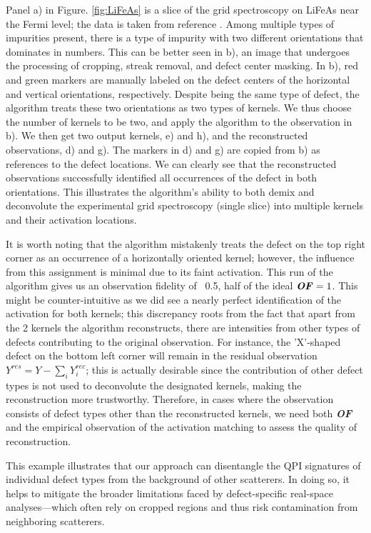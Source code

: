 Panel a) in Figure. \ref{fig:LiFeAs} is a slice of the grid spectroscopy on LiFeAs near the Fermi level; the data is taken from reference \cite{chiScanningTunnelingSpectroscopy2012}. Among multiple types of impurities present, there is a type of impurity with two different orientations that dominates in numbers. This can be better seen in b), an image that undergoes the processing of cropping, streak removal, and defect center masking. In b), red and green markers are manually labeled on the defect centers of the horizontal and vertical orientations, respectively. Despite being the same type of defect, the algorithm treats these two orientations as two types of kernels. We thus choose the number of kernels to be two, and apply the algorithm to the observation in b). We then get two output kernels, e) and h), and the reconstructed observations, d) and g). The markers in d) and g) are copied from b) as references to the defect locations. We can clearly see that the reconstructed observations successfully identified all occurrences of the defect in both orientations. This illustrates the algorithm's ability to both demix and deconvolute the experimental grid spectroscopy (single slice) into multiple kernels and their activation locations. 

It is worth noting that the algorithm mistakenly treats the defect on the top right corner as an occurrence of a horizontally oriented kernel; however, the influence from this assignment is minimal due to its faint activation. This run of the algorithm gives us an observation fidelity of ~0.5, half of the ideal $\textbf{\textit{OF}} =1$. This might be counter-intuitive as we did see a nearly perfect identification of the activation for both kernels; this discrepancy roots from the fact that apart from the 2 kernels the algorithm reconstructs, there are intensities from other types of defects contributing to the original observation. For instance, the 'X'-shaped defect on the bottom left corner will remain in the residual observation $Y^{res} = Y - \sum_i Y_i^{rec}$; this is actually desirable since the contribution of other defect types is not used to deconvolute the designated kernels, making the reconstruction more trustworthy. Therefore, in cases where the observation consists of defect types other than the reconstructed kernels, we need both \textbf{\textit{OF}} and the empirical observation of the activation matching to assess the quality of reconstruction.  

This example illustrates that our approach can disentangle the QPI signatures of individual defect types from the background of other scatterers. In doing so, it helps to mitigate the broader limitations faced by defect-specific real-space analyses—which often rely on cropped regions and thus risk contamination from neighboring scatterers.


